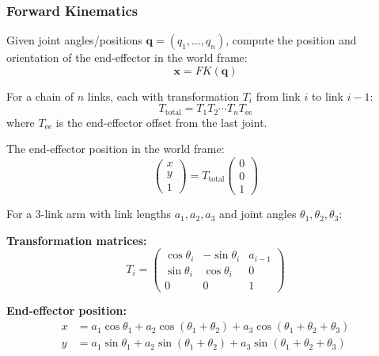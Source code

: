 \separator

\subsubsection{Forward Kinematics}

\begin{defbox}
Given joint angles/positions $\mathbf{q} = (q_1, \ldots, q_n)$, compute the position and orientation of the end-effector in the world frame:
\[
\mathbf{x} = FK(\mathbf{q})
\]
\end{defbox}

\begin{thmbox}
For a chain of $n$ links, each with transformation $T_i$ from link $i$ to link $i-1$:
\[
T_{\text{total}} = T_1 T_2 \cdots T_n T_{\text{ee}}
\]
where $T_{\text{ee}}$ is the end-effector offset from the last joint.

The end-effector position in the world frame:
\[
\begin{pmatrix} x \\ y \\ 1 \end{pmatrix} = T_{\text{total}} \begin{pmatrix} 0 \\ 0 \\ 1 \end{pmatrix}
\]
\end{thmbox}

\begin{exbox}
For a 3-link arm with link lengths $a_1, a_2, a_3$ and joint angles $\theta_1, \theta_2, \theta_3$:

\textbf{Transformation matrices:}
\[
T_i = \begin{pmatrix} \cos\theta_i & -\sin\theta_i & a_{i-1} \\ \sin\theta_i & \cos\theta_i & 0 \\ 0 & 0 & 1 \end{pmatrix}
\]

\textbf{End-effector position:}
\begin{align*}
x &= a_1\cos\theta_1 + a_2\cos(\theta_1+\theta_2) + a_3\cos(\theta_1+\theta_2+\theta_3) \\
y &= a_1\sin\theta_1 + a_2\sin(\theta_1+\theta_2) + a_3\sin(\theta_1+\theta_2+\theta_3)
\end{align*}
\end{exbox}

\separator

